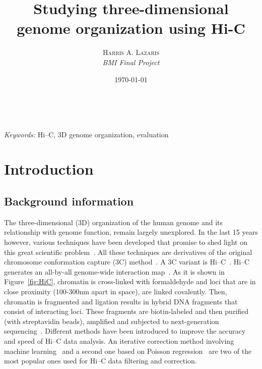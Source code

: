 \documentclass[a4paper, 11pt]{article} %
\title{\textbf{Studying three-dimensional genome organization using Hi-C}} %
\author{\textsc{Harris A. Lazaris}\\ %
{\textit{BMI Final Project}}} %
\date{\today} %
\makeatletter
\renewcommand{\maketitle}{ %
\begin{flushright} %
{\LARGE\@title} %

\vspace{50pt} %

{\large\@author} %
\\\@date %

\vspace{40pt} %
\end{flushright}
}
\makeatother
\begin{document}
\maketitle %


\renewcommand{\abstractname}{Summary} %

\begin{abstract}

\end{abstract}

\hspace*{3,6mm}\textit{Keywords:} Hi--C, 3D genome organization, evaluation  %

\vspace{30pt} %


\section*{Introduction}

\subsection*{Background information}

The three-dimensional (3D) organization of the human genome and its relationship with genome function, remain largely unexplored. In the last 15 years however, various techniques have been developed that promise to shed light on this great scientific problem~\cite{Dekker:2013hib}. All these techniques are derivatives of the original chromosome conformation capture (3C) method~\cite{Dekker:2002ib}. A 3C variant is Hi--C~\cite{LiebermanAiden:2009jz}. Hi--C generates an all-by-all genome-wide interaction map~\cite{LiebermanAiden:2009jz,Dekker:2013hib}. As it is shown in Figure~\ref{fig:HiC}, chromatin is cross-linked with formaldehyde and loci that are in close proximity (100-300nm apart in space), are linked covalently. Then, chromatin is fragmented and ligation 
results in hybrid DNA fragments that consist of interacting loci. These fragments are biotin-labeled and then purified (with streptavidin beads), amplified and subjected to next-generation sequencing~\cite{LiebermanAiden:2009jz,Belton:2012eva}.  Different methods have been introduced to improve the accuracy and speed of Hi--C data analysis. An iterative correction method involving machine learning~\cite{Imakaev:2012io} and a second one based on Poisson regression~\cite{Hu:2012es} are two of the most popular ones used for Hi--C data filtering and correction. 
\end{document}
